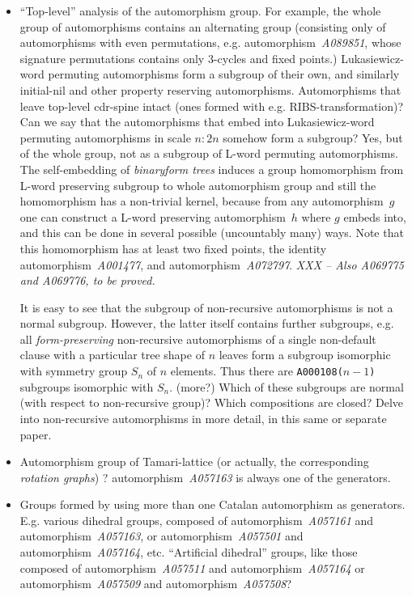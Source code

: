 \documentclass[11pt]{article} %
\newcommand{\autname}[1]{{\it *#1}}
\newcommand{\autletter}[1]{$#1$}
\newcommand{\automorphismlet}[1]{automorphism~\autletter{#1}}
\newcommand{\automorphism}[1]{automorphism~\autname{#1}}
\newcommand{\EISseq}[1]{{\tt #1}}
\begin{document}
\begin{itemize}

\item ``Top-level'' analysis of the automorphism group. For example,
the whole group of automorphisms contains an alternating group
(consisting only of automorphisms with even permutations,
e.g. \automorphism{A089851}, whose signature permutations
contains only 3-cycles and fixed points.)
Lukasiewicz-word permuting automorphisms form a subgroup
of their own, and similarly initial-nil and other
property reserving automorphisms.
Automorphisms that leave top-level cdr-spine intact
(ones formed with e.g. RIBS-transformation)?
Can we say that the automorphisms that embed into Lukasiewicz-word permuting
automorphisms in scale $n:2n$ somehow form a subgroup?
Yes, but of the whole group, not as a subgroup of
L-word permuting automorphisms. The self-embedding
of {\em binaryform trees} induces a group homomorphism
from L-word preserving subgroup to whole automorphism group
and still the homomorphism has a non-trivial kernel,
because from any \automorphismlet{g} one can construct
a L-word preserving \automorphismlet{h} where $g$
embeds into, and this can be done in several possible
(uncountably many) ways.
Note that this homomorphism has at least two fixed points,
the identity \automorphism{A001477}, and \automorphism{A072797}.
{\em XXX -- Also \autname{A069775} and  \autname{A069776}, to be proved.}

It is easy to see that the subgroup of non-recursive automorphisms is not a normal
subgroup. However, the latter itself contains further
subgroups, e.g. all {\em form-preserving} non-recursive
automorphisms of a single non-default clause with a
particular tree shape of $n$ leaves form a subgroup isomorphic with symmetry
group $S_n$ of $n$ elements. Thus there are \EISseq{A000108($n-1$)}
subgroups isomorphic with $S_n$. (more?)
Which of these subgroups are normal (with respect to non-recursive group)?
Which compositions are closed? Delve into non-recursive automorphisms in more detail,
in this same or separate paper.

\item Automorphism group of Tamari-lattice (or actually, the
      corresponding {\em rotation graphs}) ?
      \automorphism{A057163} is always one of the generators.

\item Groups formed by using more than one Catalan automorphism as generators.
E.g. various dihedral groups, composed of \automorphism{A057161} and
\automorphism{A057163}, or 
 \automorphism{A057501} and \automorphism{A057164}, etc.
``Artificial dihedral'' groups, like those composed of
\automorphism{A057511} and \automorphism{A057164} or
\automorphism{A057509} and \automorphism{A057508}?


\end{itemize}
\end{document}
